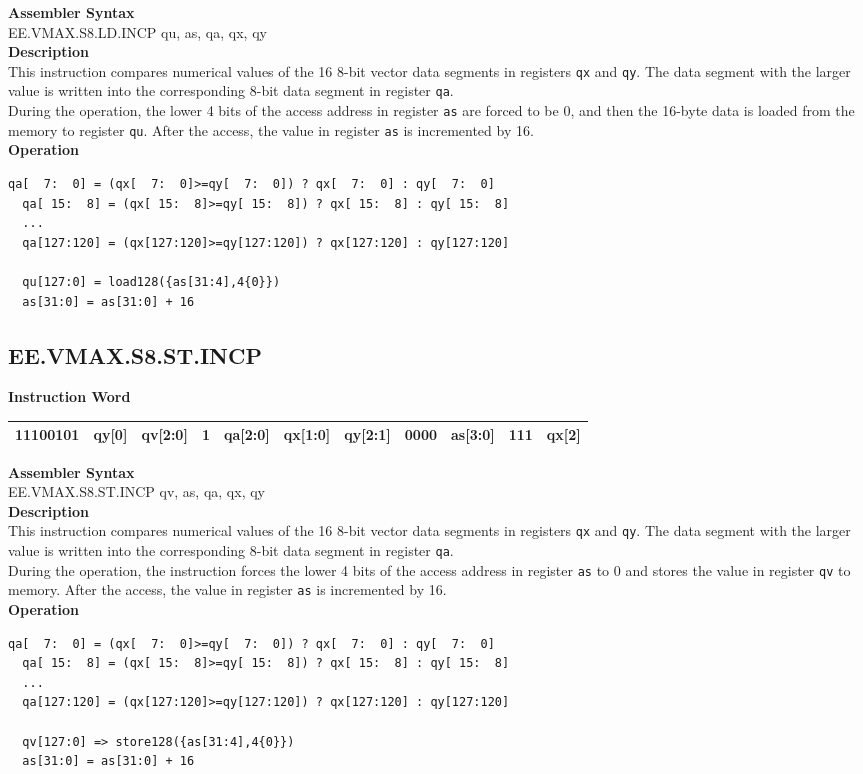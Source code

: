 \textbf{Assembler Syntax} \\
EE.VMAX.S8.LD.INCP qu, as, qa, qx, qy \\
\textbf{Description} \\
This instruction compares numerical values of the 16 8-bit vector data segments in registers \lstinline{qx} and \lstinline{qy}. The data segment with the larger value is written into the corresponding 8-bit data segment in register \lstinline{qa}.\\
During the operation, the lower 4 bits of the access address in register \lstinline{as} are forced to be 0, and then the 16-byte data is loaded from the memory to register \lstinline{qu}. After the access, the value in register \lstinline{as} is incremented by 16.\\
\textbf{Operation}
\begin{lstlisting}[escapeinside=`?]
  qa[  7:  0] = (qx[  7:  0]>=qy[  7:  0]) ? qx[  7:  0] : qy[  7:  0]
  qa[ 15:  8] = (qx[ 15:  8]>=qy[ 15:  8]) ? qx[ 15:  8] : qy[ 15:  8]
  ...
  qa[127:120] = (qx[127:120]>=qy[127:120]) ? qx[127:120] : qy[127:120]

  qu[127:0] = load128({as[31:4],4{0}})
  as[31:0] = as[31:0] + 16
\end{lstlisting}

\clearpage
\subsection{EE.VMAX.S8.ST.INCP}\label{instruction:EEVMAXS8STINCP}
\setlength\tabcolsep{6pt}
\textbf{Instruction Word} \\
\begin{tabular}{|c|c|c|c|c|c|c|c|c|c|c|}
	\hline
	11100101 & qy[0] & qv[2:0] & 1 & qa[2:0] & qx[1:0] & qy[2:1] & 0000 & as[3:0] & 111 & qx[2] \\
	\hline
\end{tabular}

\textbf{Assembler Syntax} \\
EE.VMAX.S8.ST.INCP qv, as, qa, qx, qy \\
\textbf{Description} \\
This instruction compares numerical values of the 16 8-bit vector data segments in registers \lstinline{qx} and \lstinline{qy}. The data segment with the larger value is written into the corresponding 8-bit data segment in register \lstinline{qa}.\\
During the operation, the instruction forces the lower 4 bits of the access address in register \lstinline{as} to 0 and stores the value in register \lstinline{qv} to memory. After the access, the value in register \lstinline{as} is incremented by 16.\\
\textbf{Operation}
\begin{lstlisting}[escapeinside=`?]
  qa[  7:  0] = (qx[  7:  0]>=qy[  7:  0]) ? qx[  7:  0] : qy[  7:  0]
  qa[ 15:  8] = (qx[ 15:  8]>=qy[ 15:  8]) ? qx[ 15:  8] : qy[ 15:  8]
  ...
  qa[127:120] = (qx[127:120]>=qy[127:120]) ? qx[127:120] : qy[127:120]

  qv[127:0] => store128({as[31:4],4{0}})
  as[31:0] = as[31:0] + 16
\end{lstlisting}

